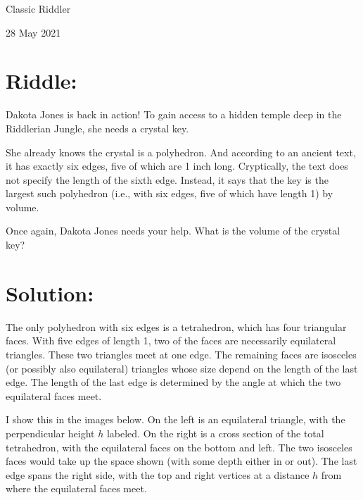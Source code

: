 \documentclass{article}
\begin{document}
\pagestyle{empty} %

\begin{center}
{\LARGE Classic Riddler}

\vspace{0.15in}

{\Large 28 May 2021}
\end{center}


\section*{Riddle:}

Dakota Jones is back in action!
To gain access to a hidden temple deep in the Riddlerian Jungle, she needs a crystal key.

She already knows the crystal is a polyhedron.
And according to an ancient text, it has exactly six edges, five of which are 1 inch long.
Cryptically, the text does not specify the length of the sixth edge.
Instead, it says that the key is the largest such polyhedron (i.e., with six edges, five of which have length 1) by volume.

Once again, Dakota Jones needs your help. What is the volume of the crystal key?


\section*{Solution:}

The only polyhedron with six edges is a tetrahedron, which has four triangular faces.
With five edges of length 1, two of the faces are necessarily equilateral triangles.
These two triangles meet at one edge.
The remaining faces are isosceles (or possibly also equilateral) triangles whose size depend on the length of the last edge.
The length of the last edge is determined by the angle at which the two equilateral faces meet.

I show this in the images below.
On the left is an equilateral triangle, with the perpendicular height $h$ labeled.
On the right is a cross section of the total tetrahedron, with the equilateral faces on the bottom and left.
The two isosceles faces would take up the space shown (with some depth either in or out).
The last edge spans the right side, with the top and right vertices at a distance $h$ from where the equilateral faces meet.
\end{document}
